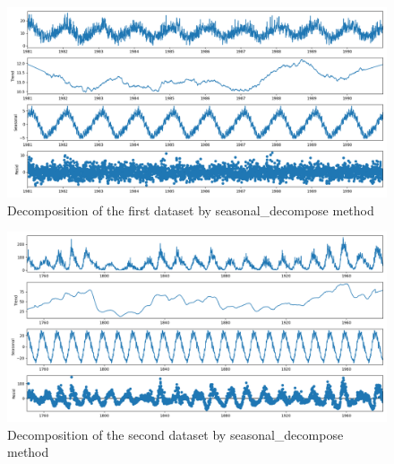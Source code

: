 \begin{figure}[H]
    \centering
    \begin{minipage}[b]{1\textwidth}
        \includegraphics[width=\textwidth]{figures/Ass1/Ass1_D1_seasonal_decompose.png}
    \end{minipage}
    \caption{Decomposition of the first dataset by seasonal\_decompose method}
    \label{fig:Ass1_D1_seasonal_decompose}
\end{figure}

\begin{figure}[H]
    \centering
    \begin{minipage}[b]{1\textwidth}
        \includegraphics[width=\textwidth]{figures/Ass1/Ass1_D2_seasonal_decompose.png}
    \end{minipage}
    \caption{Decomposition of the second dataset by seasonal\_decompose method}
    \label{fig:Ass1_D2_seasonal_decompose}
\end{figure}

